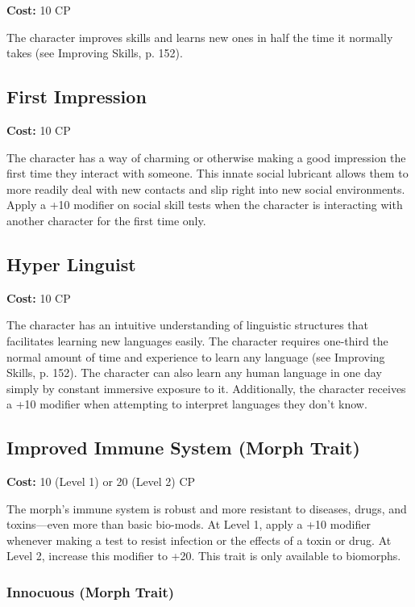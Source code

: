 \textbf{Cost:} 10 CP 

The character improves skills and learns new ones in half the time it normally takes (see Improving Skills, p. 152). 

\subsection{First Impression} \label{sec:traits-first-impression} 

\textbf{Cost:} 10 CP 

The character has a way of charming or otherwise making a good impression the first time they interact with someone. This innate social lubricant allows them to more readily deal with new contacts and slip right into new social environments. Apply a +10 modifier on social skill tests when the character is interacting with another character for the first time only. 

\subsection{Hyper Linguist} \label{sec:traits-hyper-linguist} 

\textbf{Cost:} 10 CP 

The character has an intuitive understanding of linguistic structures that facilitates learning new languages easily. The character requires one-third the normal amount of time and experience to learn any language (see Improving Skills, p. 152). The character can also learn any human language in one day simply by constant immersive exposure to it. Additionally, the character receives a +10 modifier when attempting to interpret languages they don’t know. 

\subsection{Improved Immune System (Morph Trait)} \label{sec:traits-improved-immune-system} 

\textbf{Cost:} 10 (Level 1) or 20 (Level 2) CP 

The morph’s immune system is robust and more resistant to diseases, drugs, and toxins—even more than basic bio-mods. At Level 1, apply a +10 modifier whenever making a test to resist infection or the effects of a toxin or drug. At Level 2, increase this modifier to +20. This trait is only available to biomorphs. 

\subsubsection{Innocuous (Morph Trait)} \label{sec:traits-innocuous} 

